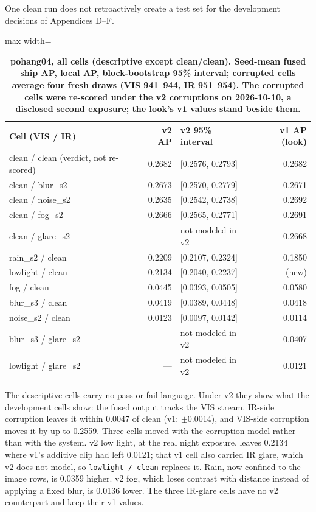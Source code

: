 \documentclass[10pt]{article}
\begin{document}
One clean run does not retroactively create a test set for the development decisions of Appendices D--F.

\begin{table}[htbp]
\centering
\small
\caption{\textbf{pohang04, all cells (descriptive except clean/clean). Seed-mean fused ship AP, local AP, block-bootstrap 95\% interval; corrupted cells average four fresh draws (VIS 941--944, IR 951--954). The corrupted cells were re-scored under the v2 corruptions on 2026-10-10, a disclosed second exposure; the look's v1 values stand beside them.}}
\label{tab:16}
\begin{adjustbox}{max width=\linewidth}
\begin{tabular}{lrlr}
\toprule
Cell (VIS / IR) & v2 AP & v2 95\% interval & v1 AP (look) \\
\midrule
clean / clean (verdict, not re-scored) & 0.2682 & [0.2576, 0.2793] & 0.2682 \\
clean / blur\_s2 & 0.2673 & [0.2570, 0.2779] & 0.2671 \\
clean / noise\_s2 & 0.2635 & [0.2542, 0.2738] & 0.2692 \\
clean / fog\_s2 & 0.2666 & [0.2565, 0.2771] & 0.2691 \\
clean / glare\_s2 & --- & not modeled in v2 & 0.2668 \\
rain\_s2 / clean & 0.2209 & [0.2107, 0.2324] & 0.1850 \\
lowlight / clean & 0.2134 & [0.2040, 0.2237] & --- (new) \\
fog / clean & 0.0445 & [0.0393, 0.0505] & 0.0580 \\
blur\_s3 / clean & 0.0419 & [0.0389, 0.0448] & 0.0418 \\
noise\_s2 / clean & 0.0123 & [0.0097, 0.0142] & 0.0114 \\
blur\_s3 / glare\_s2 & --- & not modeled in v2 & 0.0407 \\
lowlight / glare\_s2 & --- & not modeled in v2 & 0.0121 \\
\bottomrule
\end{tabular}
\end{adjustbox}
\end{table}
The descriptive cells carry no pass or fail language. Under v2 they show what the development cells show: the fused output tracks the VIS stream. IR-side corruption leaves it within 0.0047 of clean (v1: $\pm$0.0014), and VIS-side corruption moves it by up to 0.2559. Three cells moved with the corruption model rather than with the system. v2 low light, at the real night exposure, leaves 0.2134 where v1's additive clip had left 0.0121; that v1 cell also carried IR glare, which v2 does not model, so \texttt{lowlight /\allowbreak{} clean} replaces it. Rain, now confined to the image rows, is 0.0359 higher. v2 fog, which loses contrast with distance instead of applying a fixed blur, is 0.0136 lower. The three IR-glare cells have no v2 counterpart and keep their v1 values.
\end{document}
